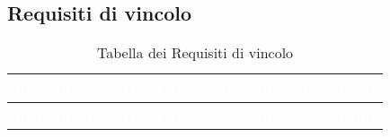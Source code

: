 \renewcommand{\o}{Obbligatorio}
\renewcommand{\d}{Desiderabile}
\subsection{Requisiti di vincolo}
{
\renewcommand{\arraystretch}{2}
\centering
\begin{longtable}{ c C{6.5cm} c c}
\caption{Tabella dei Requisiti di vincolo}\\
\textcolor{white}{\textbf{Identificativo}} & \textcolor{white}{\textbf{Descrizione}} & \textcolor{white}{\textbf{Classificazione}} & \textcolor{white}{\textbf{Fonti}}\\	
\endfirsthead
{}
\textcolor{white}{\textbf{Identificativo}} & \textcolor{white}{\textbf{Descrizione}} & \textcolor{white}{\textbf{Classificazione}} & \textcolor{white}{\textbf{Fonti}}\\
\endhead


\end{longtable}}
